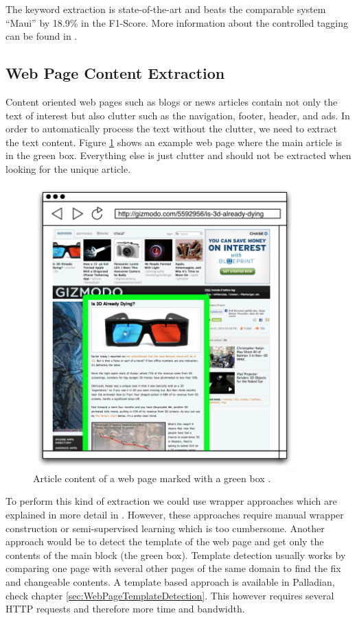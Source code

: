 The keyword extraction is state-of-the-art and beats the comparable system ``Maui''\cite{medelyan2009human} by 18.9\% in the F1-Score.
More information about the controlled tagging can be found in \cite{katz2010diploma}.

\subsection{Web Page Content Extraction}
Content oriented web pages such as blogs or news articles contain not only the text of interest but also clutter such as the navigation, footer, header, and ads. In order to automatically process the text without the clutter, we need to extract the text content. Figure \ref{fig:webpagecontentextractor} shows an example web page where the main article is in the green box. Everything else is just clutter and should not be extracted when looking for the unique article.

\begin{figure}[ht!]
\centering
\includegraphics[width=4in]{img/webpagecontentextractor.png}
\caption{Article content of a web page marked with a green box  \cite{katz2010diploma}.}
\label{fig:webpagecontentextractor}
\end{figure}

To perform this kind of extraction we could use wrapper approaches which are explained in more detail in \cite{ckgs2006}. However, these approaches require manual wrapper construction or semi-supervised learning which is too cumbersome.
Another approach would be to detect the template of the web page and get only the contents of the main block (the green box). Template detection usually works by comparing one page with several other pages of the same domain to find the fix and changeable contents. A template based approach is available in Palladian, check chapter \ref{sec:WebPageTemplateDetection}. This however requires several HTTP requests and therefore more time and bandwidth.

